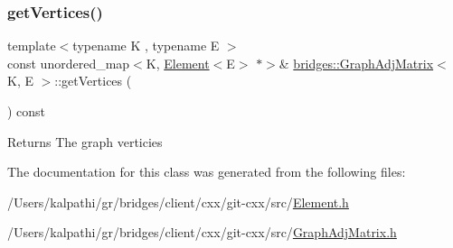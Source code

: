 \subsubsection{\texorpdfstring{get\+Vertices()}{getVertices()}}
{\footnotesize\ttfamily template$<$typename K , typename E $>$ \\
const unordered\+\_\+map$<$K, \hyperlink{classbridges_1_1_element}{Element}$<$E$>$ $\ast$$>$\& \hyperlink{classbridges_1_1_graph_adj_matrix}{bridges\+::\+Graph\+Adj\+Matrix}$<$ K, E $>$\+::get\+Vertices (\begin{DoxyParamCaption}{ }\end{DoxyParamCaption}) const\hspace{0.3cm}{\ttfamily [inline]}}

\begin{DoxyReturn}{Returns}
The graph verticies 
\end{DoxyReturn}


The documentation for this class was generated from the following files\+:\begin{DoxyCompactItemize}
\item 
/\+Users/kalpathi/gr/bridges/client/cxx/git-\/cxx/src/\hyperlink{_element_8h}{Element.\+h}\item 
/\+Users/kalpathi/gr/bridges/client/cxx/git-\/cxx/src/\hyperlink{_graph_adj_matrix_8h}{Graph\+Adj\+Matrix.\+h}\end{DoxyCompactItemize}
